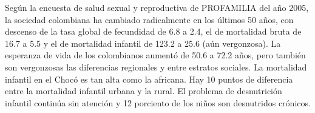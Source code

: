 Según la encuesta de salud sexual y reproductiva de PROFAMILIA del año 2005, la sociedad colombiana ha cambiado radicalmente en los últimos 50 años, con descenso de la tasa global de fecundidad de 6.8 a 2.4, el de mortalidad bruta de 16.7 a 5.5 y el de mortalidad infantil de 123.2 a 25.6 (aún vergonzosa). La esperanza de vida de los colombianos aumentó de 50.6 a 72.2 años, pero también son vergonzosas las diferencias regionales y entre estratos sociales. La mortalidad infantil en el Chocó es tan alta como la africana. Hay 10 puntos de diferencia entre la mortalidad infantil urbana y la rural. El problema de desnutrición infantil continúa sin atención y 12 porciento de los niños son desnutridos crónicos.
\endinput
